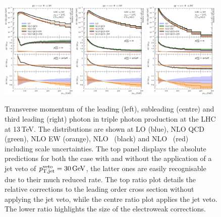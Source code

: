\begin{figure}[t!]
  \centering
  \includegraphics[width=0.32\textwidth]{figs_aaa/pT_y1}
  \includegraphics[width=0.32\textwidth]{figs_aaa/pT_y2}
  \includegraphics[width=0.32\textwidth]{figs_aaa/pT_y3}
  \caption{
    Transverse momentum of the leading (left), subleading (centre) 
    and third leading (right) photon 
    in triple photon production at the LHC at 13\,TeV. 
    The distributions are shown at LO (blue), NLO QCD (green), 
    NLO EW (orange), NLO \QCDpEW\ (black) and NLO \QCDtEW\ (red) 
    including scale uncertainties. The top panel displays the 
    absolute predictions for both the case with  and without  the 
    application of a jet veto of $p_\mathrm{T,jet}^\mathrm{veto}=\text{30\,GeV}$, 
    the latter ones are easily recognisable 
    due to their much reduced rate. The top ratio plot details 
    the relative corrections to the leading order cross section 
    without applying the jet veto, while the centre ratio plot 
    applies the jet veto. 
    The lower ratio highlights the size of the electroweak corrections.
    \label{fig:aaa:pt}
  }
\end{figure}

